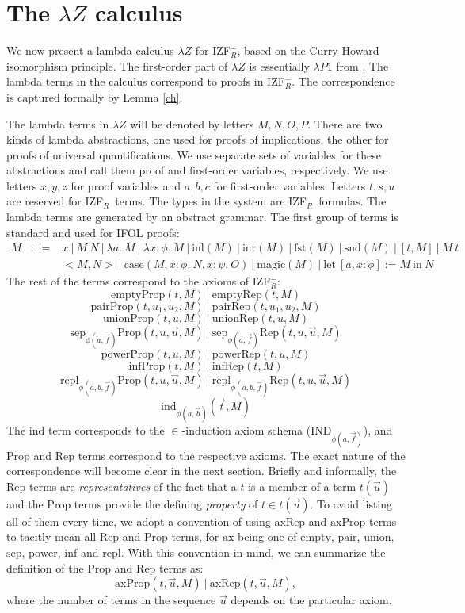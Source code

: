 \documentclass{LMCS}
\newcommand{\pl}[1]{\ensuremath{\mathrm{#1}}}
\newcommand{\FST}{\pl{fst}}
\newcommand{\SND}{\pl{snd}}
\newcommand{\LET}{\pl{let}}
\newcommand{\CASE}{\pl{case}}\newcommand{\DOM}{\pl{dom}}
\newcommand{\MAGIC}{\pl{magic}}
\newcommand{\INL}{\pl{inl}}
\newcommand{\INR}{\pl{inr}}
\newcommand{\IN}{\pl{in}}
\newcommand{\IND}{\pl{ind}}
\newcommand{\izfr}{IZF${}_R$}
\newcommand{\iizfr}{IZF${}_R^{-}$}
\newcommand{\li}{\lambda Z}
\begin{document}
\section{The $\li$ calculus}\label{lz}

We now present a lambda calculus $\li$ for \iizfr, based on the Curry-Howard isomorphism
principle. The first-order part of $\li$ is essentially $\lambda P1$ from
\cite{urzy}. The lambda terms in the calculus correspond to proofs in \iizfr.
The correspondence is captured formally by Lemma \ref{ch}. 

The lambda terms in $\li$ will be denoted by letters $M, N, O, P$. 
There are two kinds of lambda abstractions, one used for proofs of implications, the other for proofs of
universal quantifications. We use separate sets of variables for these abstractions and call them
proof and first-order variables, respectively. We use letters $x, y,
z$ for proof variables and $a, b, c$ for first-order variables. 
Letters $t, s, u$ are reserved for \izfr\ terms. The types in the system are
\izfr\ formulas. The lambda terms are generated by an abstract grammar. The
first group of terms is standard and used for IFOL proofs:
\begin{eqnarray*}
M & ::= & x\ |\ M\ N\ |\ \lambda a.\ M\ |\ \lambda x : \phi.\ M\ |\ \INL(M)\ |\
\INR(M) \ |\ \FST(M)\ | \ \SND(M)\ |\ [t, M]\ |\ M\ t\\
& & <M, N> \ |\ \CASE(M, x : \phi.\ N, x : \psi.\ O)\ |\ \MAGIC(M)\ |\ \LET\
[a, x : \phi] := M\ \IN\ N
\end{eqnarray*}
The rest of the terms correspond to the axioms of \iizfr:
\[
\pl{emptyProp}(t, M)\ |\ \pl{emptyRep}(t, M)
\]
\[
\pl{pairProp}(t, u_1, u_2, M)\ |\ \pl{pairRep}(t, u_1, u_2, M)
\]
\[
\pl{unionProp}(t, u, M)\ |\ \pl{unionRep}(t, u, M)
\]
\[
\pl{sep}_{\phi(a, \vec{f})}\pl{Prop}(t, u, \vec{u}, M)\ |\ \pl{sep}_{\phi(a, \vec{f})}\pl{Rep}(t, u, \vec{u}, M)
\]
\[
\pl{powerProp}(t, u, M)\ | \ \pl{powerRep}(t, u, M)
\]
\[
\pl{infProp}(t, M)\ | \ \pl{infRep}(t, M)
\]
\[
\pl{repl}_{\phi(a, b, \vec{f})}\pl{Prop}(t, u, \vec{u}, M)\ |\ \pl{repl}_{\phi(a,
b, \vec{f})}\pl{Rep}(t, u, \vec{u}, M)
\]
\[
\IND_{\phi(a, \vec{b})}(\vec{t}, M)
\]
The \pl{ind} term corresponds to the $\in$-induction axiom schema (IND${}_{\phi(a, \vec{f})}$),
and \pl{Prop} and \pl{Rep} terms correspond to the respective axioms.
The exact nature of the correspondence will become clear in the next
section. Briefly and informally, the \pl{Rep} terms are
\emph{representatives} of the fact that a $t$ is a member of a term
$t(\vec{u})$ and the \pl{Prop} terms provide the defining \emph{property} of
$t \in t(\vec{u})$. To avoid listing all of them every
time, we adopt a convention of using \pl{axRep} and \pl{axProp} terms to tacitly
mean all \pl{Rep} and \pl{Prop} terms, for \pl{ax} being one of \pl{empty}, \pl{pair}, \pl{union},
\pl{sep}, \pl{power}, \pl{inf} and \pl{repl}. With this convention in mind, we can summarize the
definition of the \pl{Prop} and \pl{Rep} terms as:
\[
\pl{axProp}(t, \vec{u}, M)\ |\ \pl{axRep}(t, \vec{u}, M), 
\]
where the number of terms in the sequence $\vec{u}$ depends on the particular
axiom. 
\end{document}
